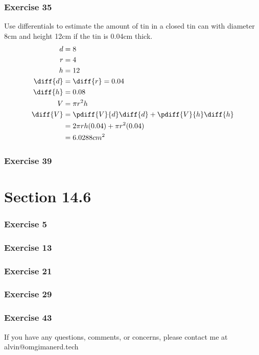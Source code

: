 \documentclass[letterpaper, 12pt]{math}
\begin{document}
\subsubsection*{Exercise 35}
Use differentials to estimate the amount of tin in a closed tin can with
diameter 8cm and height 12cm if the tin is 0.04cm thick.
\begin{align*}
  d &= 8 \\
  r &= 4 \\
  h &= 12 \\
  \diff{d} &= \diff{r} = 0.04 \\
  \diff{h} &= 0.08 \\
  V &= \pi r^2h \\
  \diff{V} &= \pdiff{V}{d}\diff{d}+\pdiff{V}{h}\diff{h} \\
  &= 2\pi rh(0.04)+\pi r^2(0.04) \\
  &= 6.0288cm^2
\end{align*}

\subsubsection*{Exercise 39}

\section*{Section 14.6}

\subsubsection*{Exercise 5}
\subsubsection*{Exercise 13}
\subsubsection*{Exercise 21}
\subsubsection*{Exercise 29}
\subsubsection*{Exercise 43}

\begin{center}
  If you have any questions, comments, or concerns, please contact me at
  alvin@omgimanerd.tech
\end{center}
\end{document}
